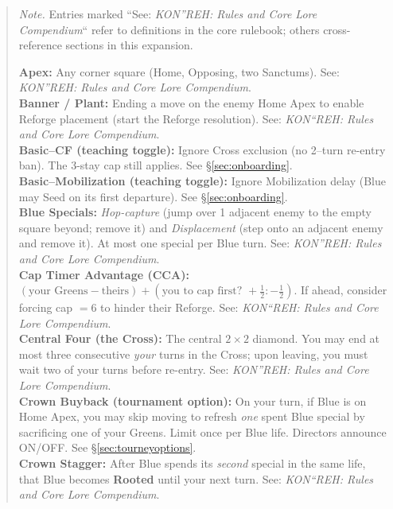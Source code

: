 \documentclass[11pt]{article}
\begin{document}
\begin{quote}
\noindent\emph{Note.} Entries marked ``See: \textit{KON''REH: Rules and Core Lore Compendium}`` refer to definitions in the core rulebook; others cross-reference sections in this expansion.

\medskip

\textbf{Apex:} Any corner square (Home, Opposing, two Sanctums). See: \textit{KON''REH: Rules and Core Lore Compendium}.\\

\textbf{Banner / Plant:} Ending a move on the enemy Home Apex to enable Reforge placement (start the Reforge resolution). See: \textit{KON``REH: Rules and Core Lore Compendium}.\\

\textbf{Basic--CF (teaching toggle):} Ignore Cross exclusion (no 2--turn re-entry ban). The 3-stay cap still applies. See \S\ref{sec:onboarding}.\\

\textbf{Basic--Mobilization (teaching toggle):} Ignore Mobilization delay (Blue may Seed on its first departure). See \S\ref{sec:onboarding}.\\

\textbf{Blue Specials:} \emph{Hop-capture} (jump over 1 adjacent enemy to the empty square beyond; remove it) and \emph{Displacement} (step onto an adjacent enemy and remove it). At most one special per Blue turn. See: \textit{KON''REH: Rules and Core Lore Compendium}.\\

\textbf{Cap Timer  Advantage (CCA):} $(\text{your Greens} - \text{theirs}) + (\text{you to cap first? } +\tfrac12 : -\tfrac12)$. If ahead, consider forcing cap $=6$ to hinder their Reforge. See: \textit{KON``REH: Rules and Core Lore Compendium}.\\

\textbf{Central Four (the Cross):} The central $2\times2$ diamond. You may end at most three consecutive \emph{your} turns in the Cross; upon leaving, you must wait two of your turns before re-entry. See: \textit{KON''REH: Rules and Core Lore Compendium}.\\

\textbf{Crown Buyback (tournament option):} On your turn, if Blue is on Home Apex, you may skip moving to refresh \emph{one} spent Blue special by sacrificing one of your Greens. Limit once per Blue life. Directors announce ON/OFF. See \S\ref{sec:tourneyoptions}.\\

\textbf{Crown Stagger:} After Blue spends its \emph{second} special in the same life, that Blue becomes \textbf{Rooted} until your next turn. See: \textit{KON``REH: Rules and Core Lore Compendium}.\\


\end{quote}
\end{document}
